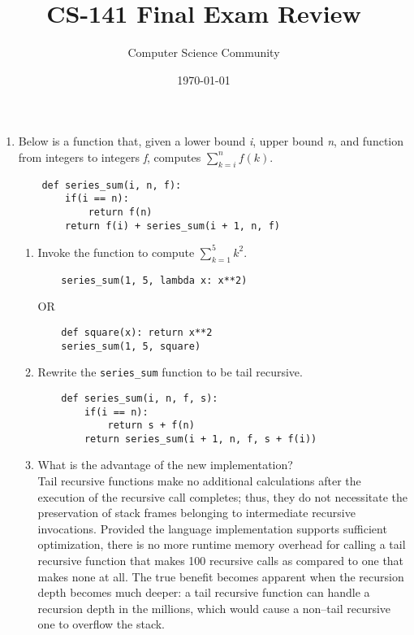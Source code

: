 \documentclass[11pt]{article}
\author{Computer Science Community}
\title{CS-141 Final Exam Review}
\date{\today}
\newenvironment{answer}{\large\lstset{basicstyle=\tiny\ttfamily}\color{white}}{}
\newenvironment{answer}{\large\lstset{basicstyle=\large\ttfamily}\color{red}}{}
\begin{document}
\header

\begin{enumerate}

\section*{Recursion}
\item Below is a function that, given a lower bound \textit{i}, upper bound \textit{n}, and function from integers to integers \textit{f}, computes $\sum\limits_{k=i}^n f(k)$.
\begin{lstlisting}
	def series_sum(i, n, f):
		if(i == n):
			return f(n)
		return f(i) + series_sum(i + 1, n, f)
\end{lstlisting}
\begin{enumerate}
\item Invoke the function to compute $\sum\limits_{k=1}^5 k^2$.
\begin{answer}
\begin{multicols}{3}
\begin{verbatim}
	series_sum(1, 5, lambda x: x**2)
\end{verbatim}
\columnbreak
\hspace{80pt} OR
\columnbreak
\begin{verbatim}
	def square(x): return x**2
	series_sum(1, 5, square)
\end{verbatim}
\end{multicols}
\end{answer}

\item Rewrite the \texttt{series\_sum} function to be tail recursive.
\begin{answer}
\begin{lstlisting}
	def series_sum(i, n, f, s):
		if(i == n):
			return s + f(n)
		return series_sum(i + 1, n, f, s + f(i))
\end{lstlisting}
\end{answer}

\item What is the advantage of the new implementation? \\
\begin{answer}
Tail recursive functions make no additional calculations after the execution of the recursive call completes; thus, they do not necessitate the preservation of stack frames belonging to intermediate recursive invocations.
Provided the language implementation supports sufficient optimization, there is no more runtime memory overhead for calling a tail recursive function that makes 100 recursive calls as compared to one that makes none at all.
The true benefit becomes apparent when the recursion depth becomes much deeper: a tail recursive function can handle a recursion depth in the millions, which would cause a non--tail recursive one to overflow the stack.
\end{answer}
\begin{answer}
\end{answer}
\end{enumerate}


\end{enumerate}
\end{document}
